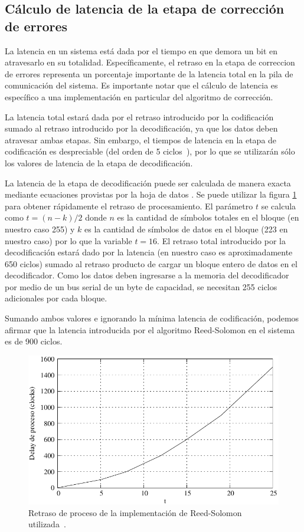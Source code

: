 \subsection{Cálculo de latencia de la etapa de corrección de errores}
La latencia en un sistema está dada por el tiempo en que demora un bit en atravesarlo en su totalidad. Específicamente, el retraso en la etapa de correccion de errores representa un porcentaje importante de la latencia total en la pila de comunicación del sistema. Es importante notar que el cálculo de latencia es específico a una implementación en particular del algoritmo de corrección.

La latencia total estará dada por el retraso introducido por la codificación sumado al retraso introducido por la decodificación, ya que los datos deben atravesar ambas etapas. Sin embargo, el tiempos de latencia en la etapa de codificación es despreciable (del orden de 5 ciclos~\cite{Xilinx:DS251}), por lo que se utilizarán sólo los valores de latencia de la etapa de decodificación. 

La latencia de la etapa de decodificación puede ser calculada de manera exacta mediante ecuaciones provistas por la hoja de datos \cite{Xilinx:DS252}. Se puede utilizar la figura \ref{fig_rslat} para obtener rápidamente el retraso de procesamiento. El parámetro $t$ se calcula como $t=(n-k)/2$ donde $n$ es la cantidad de símbolos totales en el bloque (en nuestro caso 255) y $k$ es la cantidad de símbolos de datos en el bloque (223 en nuestro caso) por lo que la variable $t=16$.  El retraso total introducido por la decodificación estará dado por la latencia (en nuestro caso es aproximadamente 650 ciclos) sumado al retraso producto de cargar un bloque entero de datos en el decodificador. Como los datos deben ingresarse a la memoria del decodificador por medio de un bus serial de un byte de capacidad, se necesitan 255 ciclos adicionales por cada bloque. 

Sumando ambos valores e ignorando la mínima latencia de codificación, podemos afirmar que la latencia introducida por el algoritmo Reed-Solomon en el sistema es de 900 ciclos.

\begin{figure}[t]
  \centering
  \includegraphics[width=0.6 \textwidth]{graphs/rsDelay.pdf} 
  \caption{Retraso de proceso de la implementación de Reed-Solomon utilizada~\cite{Xilinx:DS252}.}
  \label{fig_rslat}
\end{figure}


